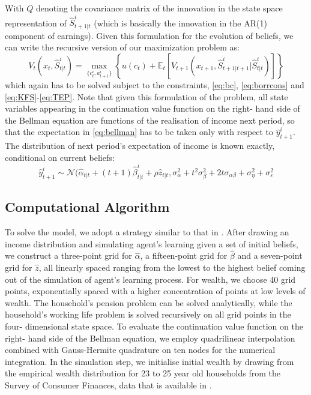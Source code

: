 With $Q$ denoting the covariance matrix of the innovation in the state space 
representation of $\hat{S}_{t+1|t}^i$ (which is basically the innovation in the 
AR(1) component of earnings). 
Given this formulation for the evolution of beliefs, we can write the recursive 
version of our maximization problem as:
\begin{equation} \label{eq:bellman}
V_t(x_t,\hat{S}^i_{t|t}) = \max_{\{c_t^i, a_{t+1}^i\}} \left\{ u(c_t) + \mathbb{E}_t \left[ V_{t+1}(x_{t+1},\hat{S}^i_{t+1|t+1}|\hat{S}^i_{t|t}) \right] \right\}
\end{equation}
which again has to be solved subject to the constraints, \ref{eq:bc}, \ref{eq:borrcons} 
and \ref{eq:KFS}-\ref{eq:TEP}. Note that given this formulation of the problem, 
all state variables appearing in the continuation value function on the right-
hand side of the Bellman equation are functions of the realisation of income 
next period, so that the expectation in \ref{eq:bellman} has to be taken only 
with respect to $\hat{y}^i_{t+1}$. The distribution of next period's expectation
of income is known exactly, conditional on current beliefs:
$$ 
\hat{y}^i_{t+1} \sim \mathcal{N}(\hat{\alpha}_{t|t} + (t+1)\hat{\beta}^i_{t|t} + \rho \hat{z}_{t|t}, \sigma^2_{\alpha} + t^2 \sigma^2_{\beta} + 2t\sigma_{\alpha \beta} + \sigma^2_{\eta} + \sigma^2_{\varepsilon}
$$


\subsection{Computational Algorithm}
To solve the model, we adopt a strategy similar to that in \citet{GuvenenSmith2014}.
After drawing an income distribution and simulating agent's learning given a set
of initial beliefs, we construct a three-point grid for $\hat{\alpha}$, a 
fifteen-point grid for $\hat{\beta}$ and a seven-point grid for $\hat{z}$, all
linearly spaced ranging from the lowest to the highest belief coming out of the
simulation of agent's learning process. For wealth, we choose 40 grid points, 
exponentially spaced with a higher concentration of points at low levels of wealth.
The household's pension problem can be solved analytically, while the household's 
working life problem is solved recursively on all grid points in the four-
dimensional state space. To evaluate the continuation value function on the right-
hand side of the Bellman equation, we employ quadrilinear interpolation combined
with Gauss-Hermite quadrature on ten nodes for the numerical integration. In the
simulation step, we initialise initial wealth by drawing from the empirical 
wealth distribution for 23 to 25 year old households from the Survey of Consumer
Finances, data that is available in \cite{HintermaierKoeniger2011}. 


